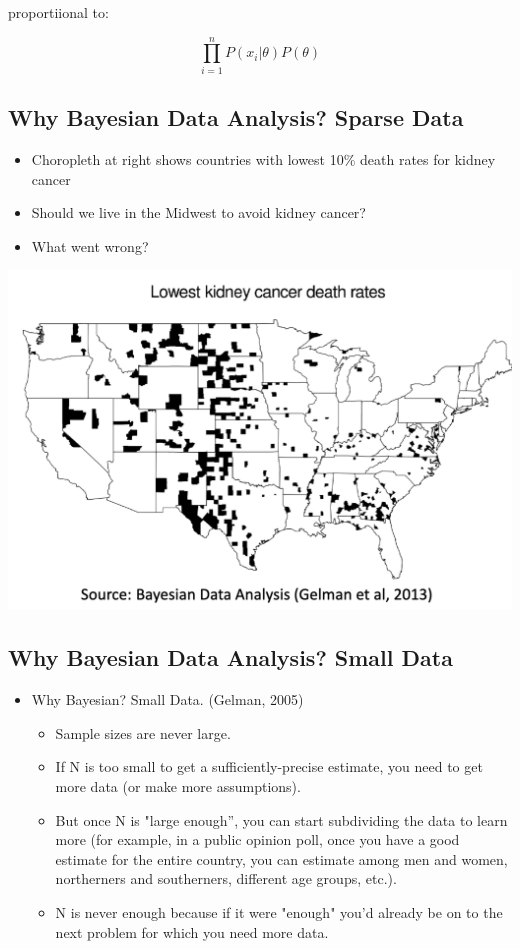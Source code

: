 \documentclass[11pt]{article}
\theoremstyle{definition}
\begin{document}
proportiional to:

\begin{equation}
    \prod_{i=1}^{n} P(x_i|\theta)P(\theta)
\end{equation}

\subsection{Why Bayesian Data Analysis? Sparse Data}
\begin{itemize}
    \item Choropleth at
    right shows
    countries with
    lowest 10\% death
    rates for kidney
    cancer
    \item Should we live in
    the Midwest to
    avoid kidney
    cancer?
    \item What went
    wrong?
\end{itemize}

\includegraphics[width=\textwidth/2]{13.png}

\subsection{Why Bayesian Data Analysis? Small Data}

\begin{itemize}
    \item Why Bayesian? Small Data. (Gelman, 2005)
    \begin{itemize}
        \item Sample sizes are never large.
        \item If N is too small to get a sufficiently-precise estimate, you need to get more
        data (or make more assumptions).
        \item But once N is "large enough”, you can start subdividing the data to learn
        more (for example, in a public opinion poll, once you have a good estimate
        for the entire country, you can estimate among men and women,
        northerners and southerners, different age groups, etc.).
        \item N is never enough because if it were "enough" you'd already be on to the
        next problem for which you need more data.
    \end{itemize}
\end{itemize}
\end{document}
